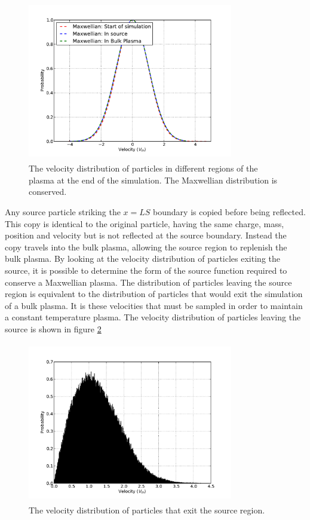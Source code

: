 \begin{figure}[H]
\centering
\includegraphics[height=7cm,width=0.8\textwidth]{maxwellian_across_domain.pdf}
\caption{The velocity distribution of particles in different regions of the plasma at the end of the simulation. The Maxwellian distribution is conserved.}
\label{fig:maxwell_maintained}
\end{figure}
Any source particle striking the $x=LS$ boundary is copied before being reflected. This copy is identical to the original particle, having the same charge, mass, position and velocity but is not reflected at the source boundary. Instead the copy travels into the bulk plasma, allowing the source region to replenish the bulk plasma. By looking at the velocity distribution of particles exiting the source, it is possible to determine the form of the source function required to conserve a Maxwellian plasma. The distribution of particles leaving the source region is equivalent to the distribution of particles that would exit the simulation of a bulk plasma. It is these velocities that must be sampled in order to maintain a constant temperature plasma. The velocity distribution of particles leaving the source is shown in figure \ref{fig:cloned_distribution}
\begin{figure}[H]
	\centering
	\includegraphics[height=7cm,width=0.8\textwidth]{cloned_distribution.pdf}
	\caption{The velocity distribution of particles that exit the source region.}
\label{fig:cloned_distribution}
	\end{figure}
